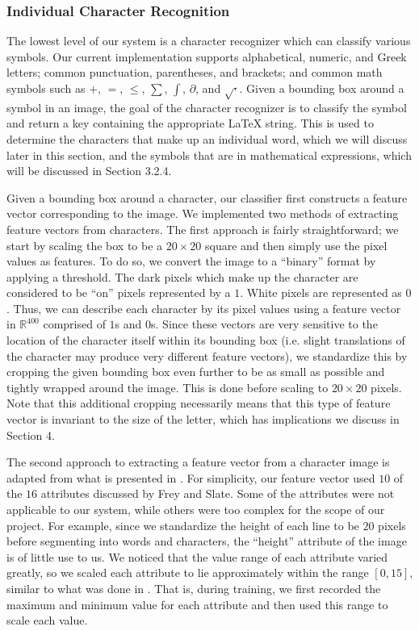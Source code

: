 \documentclass[10pt]{IEEEtran}
\newcommand{\latex}{\LaTeX\xspace}
\begin{document}
\subsubsection{Individual Character Recognition}

The lowest level of our system is a character recognizer which can classify various symbols. Our current implementation supports alphabetical, numeric, and Greek letters; common punctuation, parentheses, and brackets; and common math symbols such as $+$, $=$,  $\le$, $\sum$, $\int$, $\partial$, and $\sqrt{\cdot}$. Given a bounding box around a symbol in an image, the goal of the character recognizer is to classify the symbol and return a key containing the appropriate \latex string. This is used to determine the characters that make up an individual word, which we will discuss later in this section, and the symbols that are in mathematical expressions, which will be discussed in Section 3.2.4.

Given a bounding box around a character, our classifier first constructs a feature vector corresponding to the image. We implemented two methods of extracting feature vectors from characters. The first approach is fairly straightforward; we start by scaling the box to be a $20 \times 20$ square and then simply use the pixel values as features. To do so, we convert the image to a ``binary'' format by applying a threshold. The dark pixels which make up the character are considered to be ``on'' pixels represented by a $1$. White pixels are represented as $0$. Thus, we can describe each character by its pixel values using a feature vector in $\mathbb{R}^{400}$ comprised of $1$s and $0$s. Since these vectors are very sensitive to the location of the character itself within its bounding box (i.e. slight translations of the character may produce very different feature vectors), we standardize this by cropping the given bounding box even further to be as small as possible and tightly wrapped around the image. This is done before scaling to $20 \times 20$ pixels. Note that this additional cropping necessarily means that this type of feature vector is invariant to the size of the letter, which has implications we discuss in Section 4.

The second approach to extracting a feature vector from a character image is adapted from what is presented in \cite{2}. For simplicity, our feature vector used $10$ of the $16$ attributes discussed by Frey and Slate. Some of the attributes were not applicable to our system, while others were too complex for the scope of our project. For example, since we standardize the height of each line to be $20$ pixels before segmenting into words and characters, the ``height'' attribute of the image is of little use to us. We noticed that the value range of each attribute varied greatly, so we scaled each attribute to lie approximately within the range $[0,15]$, similar to what was done in \cite{2}. That is, during training, we first recorded the maximum and minimum value for each attribute and then used this range to scale each value.
\end{document}
